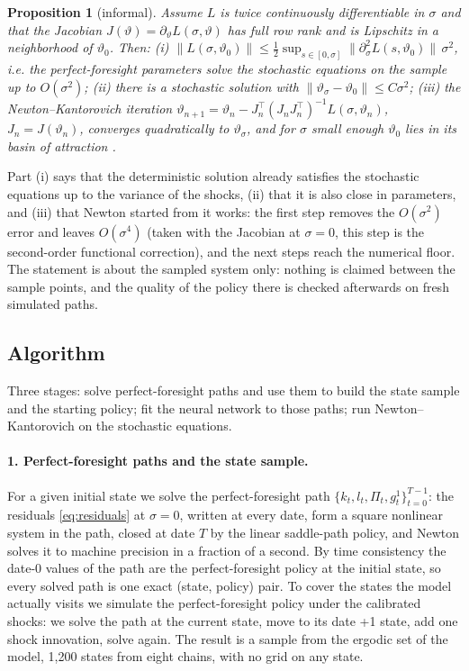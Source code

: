 \documentclass[11pt]{article}
\newtheorem{proposition}{Proposition}
\begin{document}
\begin{proposition}[informal]
\label{prop:anchor}
Assume $L$ is twice continuously differentiable in $\sigma$ and that the Jacobian $J(\vartheta) = \partial_\vartheta L(\sigma, \vartheta)$ has full row rank and is Lipschitz in a neighborhood of $\vartheta_0$. Then:
(i) $\| L(\sigma, \vartheta_0) \| \le \tfrac12 \sup_{s \in [0,\sigma]} \| \partial^2_\sigma L(s, \vartheta_0) \|\, \sigma^2$, i.e. the perfect-foresight parameters solve the stochastic equations on the sample up to $O(\sigma^2)$;
(ii) there is a stochastic solution with $\| \vartheta_\sigma - \vartheta_0 \| \le C \sigma^2$;
(iii) the Newton--Kantorovich iteration $\vartheta_{n+1} = \vartheta_n - J_n^\top (J_n J_n^\top)^{-1} L(\sigma, \vartheta_n)$, $J_n = J(\vartheta_n)$, converges quadratically to $\vartheta_\sigma$, and for $\sigma$ small enough $\vartheta_0$ lies in its basin of attraction \citep{kantorovich1982functional, deuflhard2004newton}.
\end{proposition}

Part (i) says that the deterministic solution already satisfies the stochastic equations up to the variance of the shocks, (ii) that it is also close in parameters, and (iii) that Newton started from it works: the first step removes the $O(\sigma^2)$ error and leaves $O(\sigma^4)$ (taken with the Jacobian at $\sigma = 0$, this step is the second-order functional correction), and the next steps reach the numerical floor. The statement is about the sampled system only: nothing is claimed between the sample points, and the quality of the policy there is checked afterwards on fresh simulated paths.

\subsection{Algorithm}
\label{sec:algorithm}

Three stages: solve perfect-foresight paths and use them to build the state sample and the starting policy; fit the neural network to those paths; run Newton--Kantorovich on the stochastic equations.

\paragraph{1. Perfect-foresight paths and the state sample.} For a given initial state we solve the perfect-foresight path $\{k_t, l_t, \Pi_t, g^1_t\}_{t=0}^{T-1}$: the residuals \eqref{eq:residuals} at $\sigma = 0$, written at every date, form a square nonlinear system in the path, closed at date $T$ by the linear saddle-path policy, and Newton solves it to machine precision in a fraction of a second. By time consistency the date-0 values of the path are the perfect-foresight policy at the initial state, so every solved path is one exact (state, policy) pair. To cover the states the model actually visits we simulate the perfect-foresight policy under the calibrated shocks: we solve the path at the current state, move to its date +1 state, add one shock innovation, solve again. The result is a sample from the ergodic set of the model, 1{,}200 states from eight chains, with no grid on any state.
\end{document}
